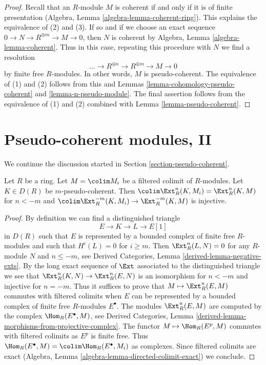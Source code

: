 \begin{proof}
Recall that an $R$-module $M$ is coherent if and only if it is of finite
presentation (Algebra, Lemma \ref{algebra-lemma-coherent-ring}).
This explains the equivalence of (2) and (3). If so and if we choose an exact
sequence $0 \to N \to R^{\oplus m} \to M \to 0$, then $N$ is coherent by
Algebra, Lemma \ref{algebra-lemma-coherent}. Thus in this case, repeating
this procedure with $N$ we find a resolution
$$
\ldots \to R^{\oplus n} \to R^{\oplus m} \to M \to 0
$$
by finite free $R$-modules. In other words, $M$ is pseudo-coherent.
The equivalence of (1) and (2) follows from this and
Lemmas \ref{lemma-cohomology-pseudo-coherent} and
\ref{lemma-n-pseudo-module}.
The final assertion follows from the equivalence of (1) and (2)
combined with Lemma \ref{lemma-pseudo-coherent}.
\end{proof}









\section{Pseudo-coherent modules, II}
\label{section-pseudo-coherent-bis}

\noindent
We continue the discussion started in Section \ref{section-pseudo-coherent}.

\begin{lemma}
\label{lemma-pseudo-coherence-colimit-ext}
Let $R$ be a ring. Let $M = \colim M_i$ be a filtered colimit of $R$-modules.
Let $K \in D(R)$ be $m$-pseudo-coherent. Then
$\colim \Ext^n_R(K, M_i) = \Ext^n_R(K, M)$ for $n < -m$ and
$\colim \Ext^{-m}_R(K, M_i) \to \Ext^{-m}_R(K, M)$ is injective.
\end{lemma}

\begin{proof}
By definition we can find a distinguished triangle
$$
E \to K \to L \to E[1]
$$
in $D(R)$ such that $E$ is represented by a bounded complex of finite free
$R$-modules and such that $H^i(L) = 0$ for $i \geq m$. Then
$\Ext^n_R(L, N) = 0$ for any $R$-module $N$ and $n \leq -m$, see
Derived Categories, Lemma \ref{derived-lemma-negative-exts}.
By the long exact sequence of $\Ext$ associated to the distinguished
triangle we see that $\Ext^n_R(K, N) \to \Ext^n_R(E, N)$ is an isomorphism
for $n < -m$ and injective for $n = -m$. Thus it suffices to prove that
$M \mapsto \Ext_R^n(E, M)$ commutes with filtered colimits
when $E$ can be represented by a bounded complex of finite free $R$-modules
$E^\bullet$. The modules $\Ext^n_R(E, M)$ are computed by
the complex $\Hom_R(E^\bullet, M)$, see Derived Categories, Lemma
\ref{derived-lemma-morphisms-from-projective-complex}.
The functor $M \mapsto \Hom_R(E^p, M)$ commutes with filtered colimits
as $E^p$ is finite free. Thus
$\Hom_R(E^\bullet, M) = \colim \Hom_R(E^\bullet, M_i)$ as complexes.
Since filtered colimits are exact (Algebra, Lemma
\ref{algebra-lemma-directed-colimit-exact}) we conclude.
\end{proof}

